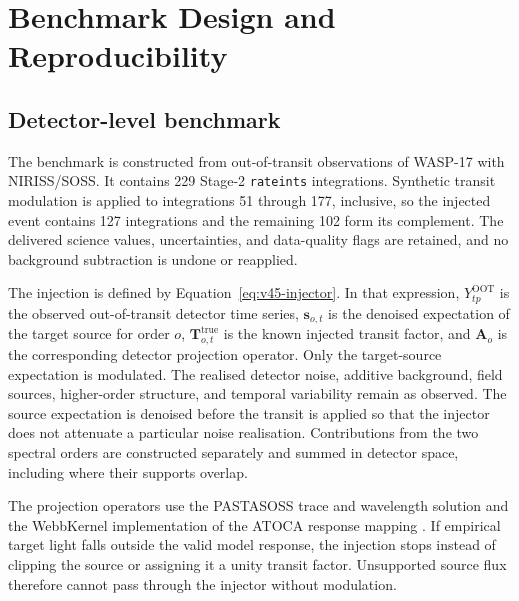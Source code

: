 \section{Benchmark Design and Reproducibility}
\label{app:benchmarking}

\subsection{Detector-level benchmark}

The benchmark is constructed from out-of-transit observations of WASP-17 with
NIRISS/SOSS. It contains 229 Stage-2 \texttt{rateints} integrations. Synthetic
transit modulation is applied to integrations 51 through 177, inclusive, so
the injected event contains 127 integrations and the remaining 102 form its
complement. The delivered science values, uncertainties, and data-quality
flags are retained, and no background subtraction is undone or reapplied.

The injection is defined by Equation~\ref{eq:v45-injector}. In that
expression, $Y^{\mathrm{OOT}}_{tp}$ is the observed out-of-transit detector
time series, $\bm{s}_{o,t}$ is the denoised expectation of the target source
for order $o$, $\bm{T}^{\mathrm{true}}_{o,t}$ is the known injected transit
factor, and $\bm{A}_o$ is the corresponding detector projection operator.
Only the target-source expectation is modulated. The realised detector noise,
additive background, field sources, higher-order structure, and temporal
variability remain as observed. The source expectation is denoised before the
transit is applied so that the injector does not attenuate a particular noise
realisation. Contributions from the two spectral orders are constructed
separately and summed in detector space, including where their supports
overlap.

The projection operators use the PASTASOSS trace and wavelength solution
\citep{BainesEtAl2023Trace,BainesEtAl2023Wavelength} and the WebbKernel
implementation of the ATOCA response mapping
\citep{DarveauBernierEtAl2022,JWSTPipeline2025}. If empirical target light
falls outside the valid model response, the injection stops instead of
clipping the source or assigning it a unity transit factor. Unsupported
source flux therefore cannot pass through the injector without modulation.

